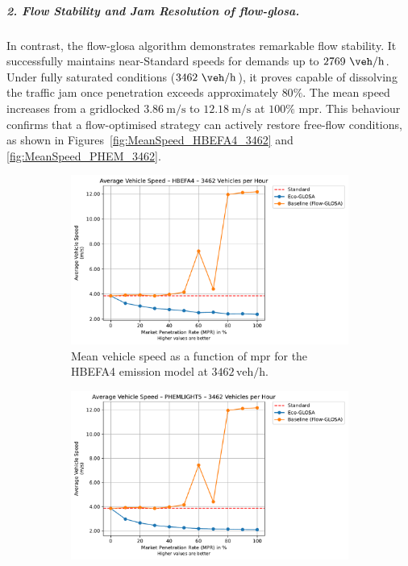 \subparagraph*{2. Flow Stability and Jam Resolution of \ac{flow-glosa}.}
In contrast, the \ac{flow-glosa} algorithm demonstrates remarkable flow stability. It successfully maintains near-Standard speeds for demands up to $2769~\unit{\veh\per\hour}$. Under fully saturated conditions ($3462~\unit{\veh\per\hour}$), it proves capable of dissolving the traffic jam once penetration exceeds approximately $80\%$. The mean speed increases from a gridlocked $3.86~\unit{\metre\per\second}$ to $12.18~\unit{\metre\per\second}$ at $100\%$ \ac{mpr}. This behaviour confirms that a flow-optimised strategy can actively restore free-flow conditions, as shown in Figures~\vref{fig:MeanSpeed_HBEFA4_3462} and \vref{fig:MeanSpeed_PHEM_3462}.

\begin{figure}[htb]
  \centering
  \begin{subfigure}[b]{0.49\textwidth}
    \includegraphics[width=\textwidth]{data/img/AverageVehicleSpeed/AverageVehicleSpeed_HBEFA4_Cars3462.pdf}
    \caption{Mean vehicle speed as a function of \ac{mpr} for the HBEFA4 emission model at $3462\,\mathrm{veh/h}$.}
    \label{fig:MeanSpeed_HBEFA4_3462}
  \end{subfigure}\hfill
  \begin{subfigure}[b]{0.49\textwidth}
    \includegraphics[width=\textwidth]{data/img/AverageVehicleSpeed/AverageVehicleSpeed_PHEMLIGHT5_Cars3462.pdf}

\end{subfigure}
\end{figure}
